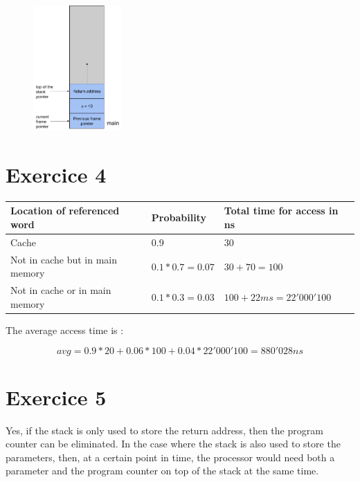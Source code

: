 \documentclass[a4paper,11pt]{report}
\begin{document}
\begin{figure}[h]
  \centering
  \includegraphics[width=0.3\textwidth]{figures/ex3_schema4}
\end{figure}

\FloatBarrier

\section*{Exercice 4}

\begin{table}[h]
\centering
\begin{tabular}{|l|l|l|}
\hline
\textbf{Location of referenced word} & \textbf{Probability} & \textbf{Total time for access in ns} \\ \hline
Cache                                & $0.9$                & $30$                                 \\ \hline
Not in cache but in main memory      & $0.1 * 0.7 = 0.07$   & $30 + 70 = 100$                      \\ \hline
Not in cache or in main memory       & $0.1 * 0.3 = 0.03$   & $100 + 22ms = 22'000'100$            \\ \hline
\end{tabular}
\end{table}

The average access time is :

\[
  avg = 0.9 * 20 + 0.06 * 100 + 0.04 * 22'000'100 = 880'028 ns
\]

\section*{Exercice 5}

Yes, if the stack is only used to store the return address, then the program
counter can be eliminated. In the case where the stack is also used to store the
parameters, then, at a certain point in time, the processor would need both a
parameter and the program counter on top of the stack at the same time.
\end{document}
